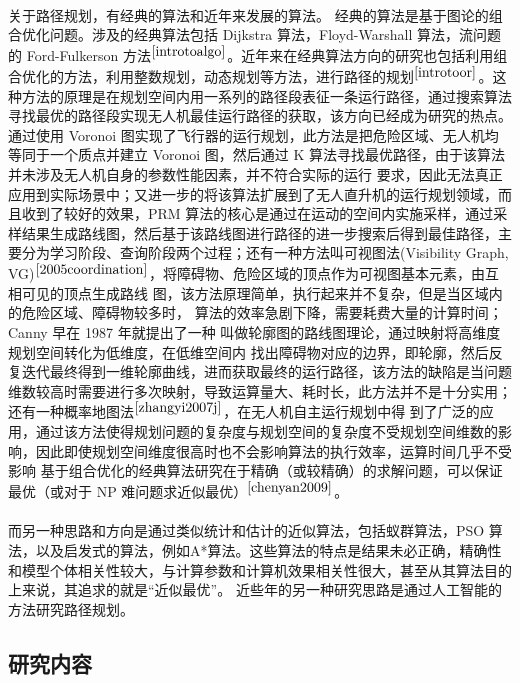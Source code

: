 \documentclass[UTF8,a4paper]{ctexart}
\begin{document}
\paragraph{}关于路径规划，有经典的算法和近年来发展的算法。 经典的算法是基于图论的组合优化问题。涉及的经典算法包括 Dijkstra 算法，Floyd-Warshall 算法，流问题的 Ford-Fulkerson 方法$^{\cite{introtoalgo}}$。近年来在经典算法方向的研究也包括利用组合优化的方法，利用整数规划，动态规划等方法，进行路径的规划$^{\cite{introtoor}}$。这种方法的原理是在规划空间内用一系列的路径段表征一条运行路径，通过搜索算法寻找最优的路径段实现无人机最佳运行路径的获取，该方向已经成为研究的热点。通过使用 Voronoi 图实现了飞行器的运行规划，此方法是把危险区域、无人机均等同于一个质点并建立 Voronoi 图，然后通过 K 算法寻找最优路径，由于该算法并未涉及无人机自身的参数性能因素，并不符合实际的运行 要求，因此无法真正应用到实际场景中；又进一步的将该算法扩展到了无人直升机的运行规划领域，而且收到了较好的效果，PRM 算法的核心是通过在运动的空间内实施采样，通过采样结果生成路线图，然后基于该路线图进行路径的进一步搜索后得到最佳路径，主要分为学习阶段、查询阶段两个过程；还有一种方法叫可视图法(Visibility Graph, VG)$^{\cite{2005coordination}}$，将障碍物、危险区域的顶点作为可视图基本元素，由互相可见的顶点生成路线 图，该方法原理简单，执行起来并不复杂，但是当区域内的危险区域、障碍物较多时， 算法的效率急剧下降，需要耗费大量的计算时间；Canny 早在 1987 年就提出了一种 叫做轮廓图的路线图理论，通过映射将高维度规划空间转化为低维度，在低维空间内 找出障碍物对应的边界，即轮廓，然后反复迭代最终得到一维轮廓曲线，进而获取最终的运行路径，该方法的缺陷是当问题维数较高时需要进行多次映射，导致运算量大、耗时长，此方法并不是十分实用；还有一种概率地图法$^{\cite{zhangyi2007j}}$，在无人机自主运行规划中得 到了广泛的应用，通过该方法使得规划问题的复杂度与规划空间的复杂度不受规划空间维数的影响，因此即使规划空间维度很高时也不会影响算法的执行效率，运算时间几乎不受影响 基于组合优化的经典算法研究在于精确（或较精确）的求解问题，可以保证最优（或对于 NP 难问题求近似最优）$^{\cite{chenyan2009}}$。
\paragraph{}而另一种思路和方向是通过类似统计和估计的近似算法，包括蚁群算法，PSO 算法，以及启发式的算法，例如A*算法。这些算法的特点是结果未必正确，精确性和模型个体相关性较大，与计算参数和计算机效果相关性很大，甚至从其算法目的上来说，其追求的就是“近似最优”。 近些年的另一种研究思路是通过人工智能的方法研究路径规划。

\subsection{研究内容}
\end{document}
